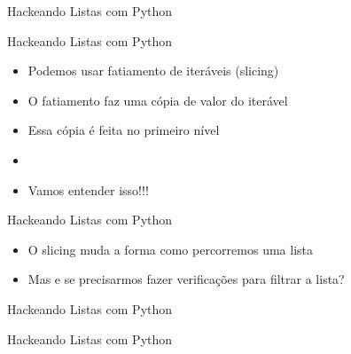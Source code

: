 \begin{frame}{Hackeando Listas com Python}
	\centering {}
	\lstset{language=Python}
	
	\textbf{}
\end{frame}

\begin{frame}{Hackeando Listas com Python}
\begin{itemize}
	\item 	Podemos usar fatiamento de iteráveis (slicing)
	\item 	O fatiamento faz uma cópia de valor do iterável
	\item 	Essa cópia é feita no primeiro nível
	\item \textbf{}
	\item Vamos entender isso!!!
\end{itemize}
\end{frame}

\begin{frame}{Hackeando Listas com Python}
\begin{itemize}
	\item 	O slicing muda a forma como percorremos uma lista
	\item 	Mas e se precisarmos fazer verificações para filtrar a lista?
\end{itemize}
\end{frame}

\begin{frame}{Hackeando Listas com Python}
\begin{itemize}
	\centering {}
	\lstset{language=Python}
	
\end{itemize}
\end{frame}

\begin{frame}{Hackeando Listas com Python}
	\centering {}
	\lstset{language=Python}
	
\end{frame}
